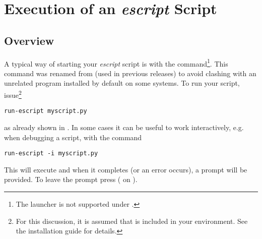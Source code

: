 
%
%
%

\chapter{Execution of an {\it escript} Script}
\label{EXECUTION}

\section{Overview}
A typical way of starting your {\it escript} script  is with
the  command\footnote{The
 launcher is not supported under \WINDOWS.}.
This command was renamed from  (used in previous releases) to
avoid clashing with an unrelated program installed by default on some systems.
To run your script, issue\footnote{For this discussion, it is assumed that
 is included in your  environment. See the
installation guide for details.}
\begin{verbatim}
run-escript myscript.py
\end{verbatim}
as already shown in .
In some cases it can be useful to work interactively, e.g. when debugging a
script, with the command 
\begin{verbatim}
run-escript -i myscript.py
\end{verbatim}
This will execute  and when it completes (or an error occurs),
a \PYTHON prompt will be provided.
To leave the prompt press  ( on \WINDOWS).

